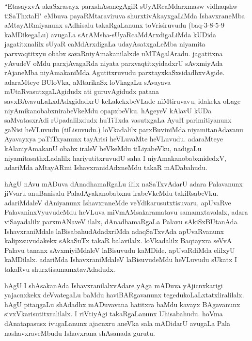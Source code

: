 
\begin{artha}
``EtasayxvA akaSxrasayx parxshAsanegAgiR sUyARcaMdarxmasw vidhaqshw tiSaThxtaH" eMbuva payaRMtaraviruva shurxtivAkayxgaLiMda IshavxraneMba aMtayARmiyanunx sAdhisalu takaRgaLanunx toVrisiruvudu (baq-3-8-5-9 kaMDikegaLu) avugaLa sArAMsha-sUyaRcaMdArxdigaLiMda kUDida jagatitxnalilx sUyaR caMdArxdigaLa  udayAsatxgaLeMba niyamita parxvaqtitxyu obabx savaRniyAmakanilalxde uMTAgalAradu. jagatitxna yAvudeV oMdu parxjAvagaRda niyata parxvaqtitxyidadxrU sAvxmiyAda rAjaneMba niyAmakaniMda Agutitxruvudu parxtayxkaSxsidadhxvAgide. adaraMteye BUloVka, aMtarikaSx loVkagaLu sAvayava mUtaRvasutxgaLAgidudx ati guruvAgidudx patana savxBAvavuLaLxdAdxgidadxrU keLakekxbeVLade niMtiruvavu, idakekx oLage niyAmikanobabxnirabeVkeMdu opapxbeVku. hAgeyeV kAlavU kUDa saMvatasxrAdi rUpadalilxdudx huTiTxda vasutxgaLa AyuH parimitiyanunx gaNisi heVLuvudu (tiLisuvudu.) loVkadalilx parxBuviniMda niyamitanAdavanu Ayavayxya paTiTxyanunx tayArisi heVLuvaMte heVLuvudu. adaraMteye kAlaniyAmakanU obabx iraleV beVkeMdu tiLiyabeVku, nadigaLu niyamitasathxLadalilx hariyutitxruvudU saha I niyAmakanobabxnidedxV, adariMda aMtayARmi IshavxranidAdxneMdu takaR mADabahudu. 
\end{artha}

\begin{artha}
hAgU nAvu mADuva dAnadhamaRgaLu ililx naSaTxvAdarU adara Palavanunx jiVvaru anuBanisalu PaladAyakanobabxnu irabeVkeMdu takiRsabeVku. adariMdaleV dAniyanunx IshavxraneMde veYdikarusutxtisuvaru, apUvaRve PalavaninxVyuvudeMdu heVLuva miVmAMsakaramatavu samamxtavalalx, adara viSayadalilx parxmANaveV ilalx, dAnadhamaRgaLa Palavu sAkiSxBUtanAda IshavxraniMdale laBisabahudAdadxriMda adaqSaTxvAda apUvaRvanunx kalipxsuvudakekx sAkaSuTx takaR balavilalx. loVkadalilx Baqtayxra seVvA Palavu tananx sAvxmiyiMdaleV laBisuvudu kaMDide. apUvaRdiMda elilxyU kaMDilalx. adariMda IshavxraniMdaleV laBisuvudeMdu heVLuvudu sUkatx I takaRvu shurxtisamamxtavAdadudx.
\end{artha}%

\begin{artha}
hAgU I shAsakanAda IshavxranilalxvAdare yAga mADuva yAjicnxkarigi yajacnxkekx deVvategaLu baMdu haviBARgavanunx tegedukoLaLxtatxliralilalx. hAgU pitaqgaLu shAdadhx mADuvavana hatitxra baMdu kavayx BAgavanunx sivxVkarisutitxralilalx. I riVtiyAgi takaRgaLanunx Uhisabahudu. hoVma dAnatapasusx ivugaLanunx ajacnxru aneVka sala mADidarU avugaLa Pala nashavxraveMbudu Ishavxrana shAsanada gurutu. 
\end{artha}

